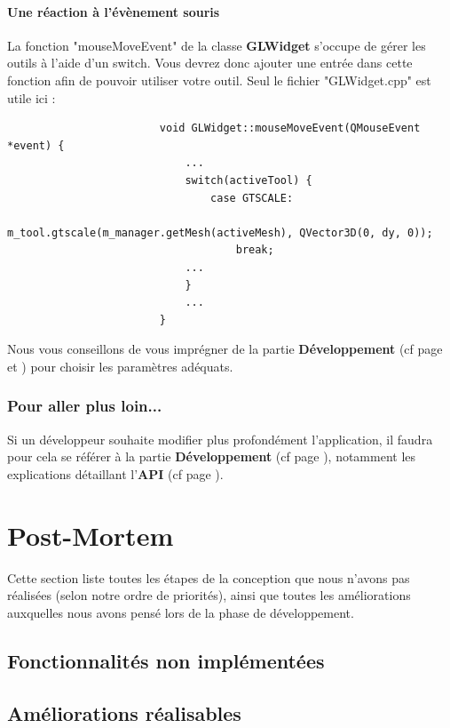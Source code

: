 \documentclass[a4paper]{memoir}
\begin{document}
				\subsubsection{Une réaction à l'évènement souris}
					La fonction "mouseMoveEvent" de la classe \textbf{GLWidget} s'occupe de gérer les outils à l'aide d'un switch. Vous devrez donc ajouter 
					une entrée dans cette fonction afin de pouvoir utiliser votre outil. Seul le fichier "GLWidget.cpp" est utile ici :
					\begin{verbatim}
						void GLWidget::mouseMoveEvent(QMouseEvent *event) {
						    ...
						    switch(activeTool) {
						        case GTSCALE:
						            m_tool.gtscale(m_manager.getMesh(activeMesh), QVector3D(0, dy, 0));
						            break;
						    ...
						    }
						    ...
						}
					\end{verbatim}
					Nous vous conseillons de vous imprégner de la partie \textbf{Développement} (cf page \pageref{tool-dev} et \pageref{glwidget-dev}) pour 
					choisir les paramètres adéquats.
				
			\subsection{Pour aller plus loin...}
				Si un développeur souhaite modifier plus profondément l'application, il faudra pour cela se référer à la partie \textbf{Développement} (cf 
				page \pageref{dev}), notamment les explications détaillant l'\textbf{API} (cf page \pageref{api-dev}).

	\chapter{Post-Mortem}
		Cette section liste toutes les étapes de la conception que nous n'avons pas réalisées (selon notre ordre de priorités), ainsi que toutes les 
		améliorations auxquelles nous avons pensé lors de la phase de développement.
		
		\section{Fonctionnalités non implémentées}
			
		\section{Améliorations réalisables}
\end{document}
